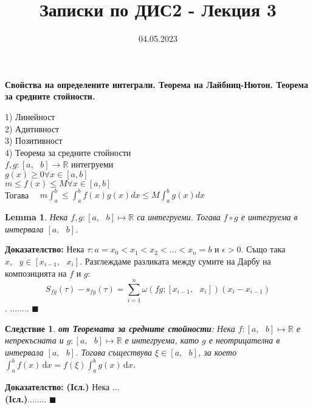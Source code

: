 \documentclass[12pt]{article}
\newtheorem{corollary}{Следствие}
\newtheorem{lemma}{Lemma}
\newcommand{\spc}{\text{ }}
\begin{document}
	\color{white}
	\pagecolor{darkgray}
	\title{Записки по ДИС2 - Лекция 3}
	\date{04.05.2023}
	\maketitle
	\begin{center}
		\Large
		\textbf{Свойства на определените интеграли. Теорема на Лайбниц-Нютон. Теорема за средните стойности.}
	\end{center}

	$\spc$\\
	1) Линейност\\
	2) Адитивност\\
	3) Позитивност\\
	4) Теорема за средните стойности\\
	$f,g: \left[a,\spc b\right] \rightarrow \mathbb{R}$ интегруеми\\
	$g(x) \geq 0 \forall x \in [a,b]$\\
	$m \leq f(x) \leq M \forall x \in [a,b]$\\
	Тогава $\quad m\int_{a}^{b}\leq \int_{a}^{b}f(x)g(x)dx\leq M\int_{a}^{b}g(x)dx$\\
	
	\begin{lemma}
		Нека $f,g: \left[a,\spc b\right] \mapsto \mathbb{R}$ са интегруеми. Тогава $f\circ g$ е интегруема в интервала $\left[a,\spc b\right]$.
	\end{lemma}
	\textbf{Доказателство:} Нека $\tau : a=x_{0}<x_{1}<x_{2}<...<x_{n}=b$ и $\epsilon>0$. Също така $x,\spc y\in\left[x_{i-1},\spc x_{i}\right]$. Разглеждаме разликата между сумите на Дарбу на композицията на $f$ и $g$:
	\[S_{fg}(\tau)-s_{fg}(\tau)=\sum_{i=1}^{n}\omega (fg;\left[x_{i-1},\spc x_{i}\right])(x_{i} - x_{i-1})\].
	........
	$\blacksquare$
	
	\begin{corollary}
		\textbf{от Теоремата за средните стойности}: Нека $f: \left[a,\spc b\right] \mapsto \mathbb{R}$ е непрекъсната и $g: \left[a,\spc b\right] \mapsto \mathbb{R}$ е интегруема, като $g$ е неотрицателна в интервала $\left[a,\spc b\right]$. Тогава съществува $\xi\in\left[a,\spc b\right]$, за което $\int_{a}^{b} f(x)\,\mathrm{d}x = f(\xi)\int_{a}^{b} g(x)\,\mathrm{d}x$.
	\end{corollary}
	\textbf{Доказателство:} \textbf{(Iсл.)} Нека ...\\
	\textbf{(Iсл.)}........
	$\blacksquare$
	
\end{document}
